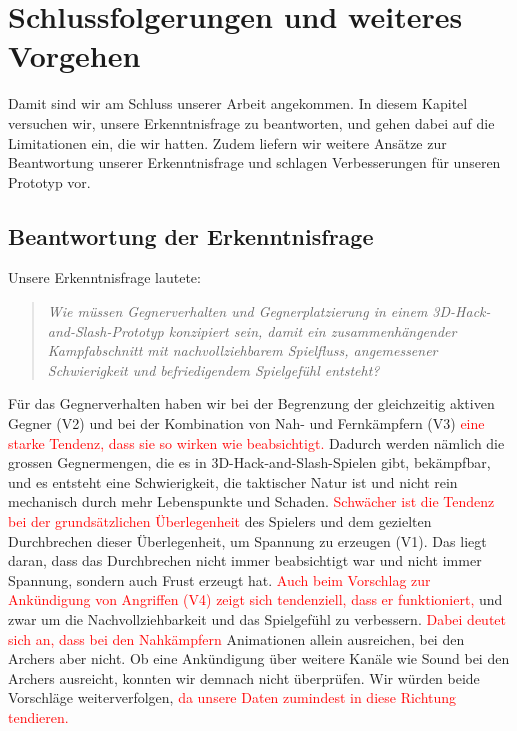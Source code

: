 \documentclass[../Main.tex]{subfiles}
\begin{document}
\section{Schlussfolgerungen und weiteres Vorgehen} \label{sec:Schlussfolgerungen}

Damit sind wir am Schluss unserer Arbeit angekommen. In diesem Kapitel versuchen wir, unsere Erkenntnisfrage zu beantworten, und gehen dabei auf die Limitationen ein, die wir hatten. Zudem liefern wir weitere Ansätze zur Beantwortung unserer Erkenntnisfrage und schlagen Verbesserungen für unseren Prototyp vor.

\subsection{Beantwortung der Erkenntnisfrage} \label{sec:Beantwortung}

Unsere Erkenntnisfrage lautete:

\begin{quote}
    \textit{Wie müssen Gegnerverhalten und Gegnerplatzierung in einem 3D-Hack-and-Slash-Prototyp konzipiert sein, damit ein zusammenhängender Kampfabschnitt mit nachvollziehbarem Spielfluss, angemessener Schwierigkeit und befriedigendem Spielgefühl entsteht?}
\end{quote}

Für das Gegnerverhalten haben wir bei der Begrenzung der gleichzeitig aktiven Gegner (V2) und bei der Kombination von Nah- und Fernkämpfern (V3) \textcolor{red}{eine starke Tendenz, dass sie so wirken wie beabsichtigt.} Dadurch werden nämlich die grossen Gegnermengen, die es in 3D-Hack-and-Slash-Spielen gibt, bekämpfbar, und es entsteht eine Schwierigkeit, die taktischer Natur ist und nicht rein mechanisch durch mehr Lebenspunkte und Schaden. \textcolor{red}{Schwächer ist die Tendenz bei der grundsätzlichen Überlegenheit} des Spielers und dem gezielten Durchbrechen dieser Überlegenheit, um Spannung zu erzeugen (V1). Das liegt daran, dass das Durchbrechen nicht immer beabsichtigt war und nicht immer Spannung, sondern auch Frust erzeugt hat. \textcolor{red}{Auch beim Vorschlag zur Ankündigung von Angriffen (V4) zeigt sich tendenziell, dass er funktioniert,} und zwar um die Nachvollziehbarkeit und das Spielgefühl zu verbessern. \textcolor{red}{Dabei deutet sich an, dass bei den Nahkämpfern} Animationen allein ausreichen, bei den Archers aber nicht. Ob eine Ankündigung über weitere Kanäle wie Sound bei den Archers ausreicht, konnten wir demnach nicht überprüfen. Wir würden beide Vorschläge weiterverfolgen, \textcolor{red}{da unsere Daten zumindest in diese Richtung tendieren.}
\end{document}

